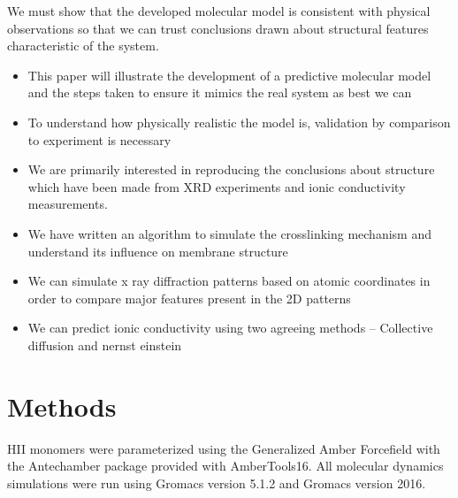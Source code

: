 \documentclass{article}
\begin{document}
	We must show that the developed molecular model is consistent with physical observations so that we can trust conclusions drawn about structural features characteristic of the system.
	\begin{itemize}
		\item This paper will illustrate the development of a predictive molecular model and the steps taken to ensure it mimics the real system as best we can 
		\item To understand how physically realistic the model is, validation by comparison to experiment is necessary
		\item We are primarily interested in reproducing the conclusions about structure which have been made from XRD experiments and ionic conductivity measurements.    
		\item We have written an algorithm to simulate the crosslinking mechanism and understand its influence on membrane structure
		\item We can simulate x ray diffraction patterns based on atomic coordinates in order to compare major features present in the 2D patterns
		\item We can predict ionic conductivity using two agreeing methods -- Collective diffusion and nernst einstein
	\end{itemize}
	
	\section{Methods}
	
	HII monomers were parameterized using the Generalized Amber Forcefield with the Antechamber package provided with AmberTools16. All molecular dynamics simulations were run using Gromacs version 5.1.2 and Gromacs version 2016.
	
\end{document}
